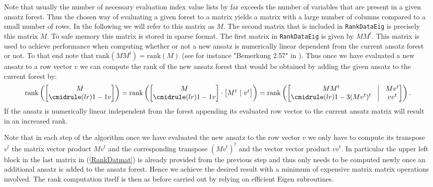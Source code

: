 \documentclass[a4paper,12pt, DIV=14, BCOR=5mm, twoside, headsepline]{scrbook}
\begin{document}
Note that usually the number of necessary evaluation index value lists by far exceeds the number of variables  that are present in a given ansatz forest. Thus the chosen way of evaluating a given forest to a matrix yields a matrix with a large number of columns compared to a small number of rows. In the following we will refer to this matrix as $M$. The second matrix that is included in \texttt{RankDataEig} is precisely this matrix $M$. To safe memory this matrix is stored in sparse format. The first matrix in \texttt{RankDataEig} is given by $M M^t$. This matrix is used to achieve performance when computing whether or not a new ansatz is numerically linear dependent from the current ansatz forest or not. To that end note that $\mathrm{rank}(MM^t) = \mathrm{rank}(M)$ (see for instance "Bemerkung 2.57" in \cite{LAKnab}). Thus once we have evaluated a new ansatz to a row vector $v$ we can compute the rank of the new ansatz forest that would be obtained by adding the given ansatz to the current forest by:
\begin{align}\label{RankDatmat}
    \mathrm{rank}\left (\begin{bmatrix}
        M \\
        \cmidrule(lr){1-1} 
        v
    \end{bmatrix} \right )
    = \mathrm{rank} \left ( \begin{bmatrix}
        M \\
        \cmidrule(lr){1-1}
        v
    \end{bmatrix} \cdot \begin{bmatrix}
        M^t \ \vert \  v^t 
    \end{bmatrix} \right ) = \mathrm{rank} \left (\begin{bmatrix}
        MM^t & \vline & M v^t \\
        \cmidrule(lr){1-3}
        (Mv^t)^t & \vline & vv^t 
    \end{bmatrix}  \right ).
\end{align}
If the ansatz is numerically linear independent from the forest appending its evaluated row vector to the current ansatz matrix will result in an increased rank.

Note that in each step of the algorithm once we have evaluated the new ansatz to the row vector $v$ we only have to compute its transpose $v^t$ the matrix vector product $Mv^t$ and the corresponding transpose $(Mv^t)^t$ and the vector vector product $v v^t$. In particular the upper left block in the last matrix in (\ref{RankDatmat}) is already provided from the previous step and thus only needs to be computed newly once an additional ansatz is added to the ansatz forest. Hence we achieve the desired result with a minimum of expensive matrix matrix operations involved. The rank computation itself is then as before carried out by relying on efficient Eigen subroutines.
\end{document}
